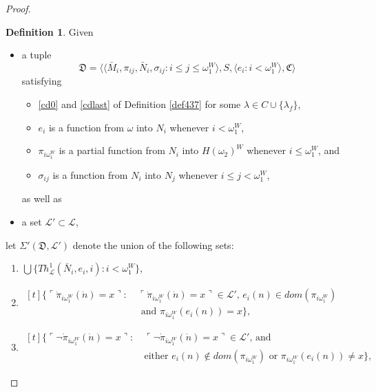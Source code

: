 \documentclass[12pt, twoside]{memoir}
\numberwithin{equation}{section}
\theoremstyle{definition}
\newtheorem{defi}[thm]{Definition}
\theoremstyle{remark}
\theoremstyle{definition}
\theoremstyle{definition}
\theoremstyle{definition}
\theoremstyle{remark}
\begin{document}
\begin{proof}
\begin{defi}\label{def439}
Given 
\begin{itemize}
    \item a tuple
    \begin{equation*}
        \mathfrak{D} = \langle \langle \bar{M}_i, \pi_{ij},  \bar{N}_i, \sigma_{ij} : i \leq j \leq \omega_1^{W} \rangle, S, \langle e_i : i < \omega_1^W \rangle, \mathfrak{C} \rangle
    \end{equation*}
    satisfying 
    \begin{itemize}[label=$\circ$]
        \item \ref{cd0} and \ref{cdlast} of Definition \ref{def437} for some $\lambda \in C \cup \{\lambda_f\}$, 
        \item $e_i$ is a function from $\omega$ into $N_i$ whenever $i < \omega_1^W$, 
        \item $\pi_{i\omega_1^W}$ is a partial function from $N_i$ into $H(\omega_2)^W$ whenever $i \leq \omega_1^W$, and
        \item $\sigma_{ij}$ is a function from $N_i$ into $N_j$ whenever $i \leq j < \omega_1^W$,
    \end{itemize}
    as well as 
    \item a set $\mathcal{L}' \subset \mathcal{L}$,
\end{itemize}
let $\Sigma'(\mathfrak{D}, \mathcal{L}')$ denote the union of the following sets:
\begin{enumerate}[label=(\alph*)]
    \item $\bigcup \{Th^{1}_{\mathcal{L}}(\bar{N}_i, e_i, i) : i < \omega_1^W\}$,
    \item 
    \!
    $\begin{aligned}[t]
        \{\ulcorner \dot{\pi}_{i\omega_1^W}(\dot{n}) = x \urcorner : \ & \ulcorner \dot{\pi}_{i\omega_1^W}(\dot{n}) = x \urcorner \in \mathcal{L}' \text{, } e_i(n) \in dom(\pi_{i\omega_1^W}) \\ 
        & \text{ and } \pi_{i\omega_1^W}(e_i(n)) = x\} \text{,}
    \end{aligned}$
    \item 
    \!
    $\begin{aligned}[t]
        \{\ulcorner \neg \dot{\pi}_{i\omega_1^W}(\dot{n}) = x \urcorner : \ & \ulcorner \neg \dot{\pi}_{i\omega_1^W}(\dot{n}) = x \urcorner \in \mathcal{L}' \text{, and} \\
        & \text{either } e_i(n) \not\in dom(\pi_{i\omega_1^W}) \text{ or } \pi_{i\omega_1^W}(e_i(n)) \neq x\} \text{,}
    \end{aligned}$

\end{enumerate}
\end{defi}
\end{proof}
\end{document}
